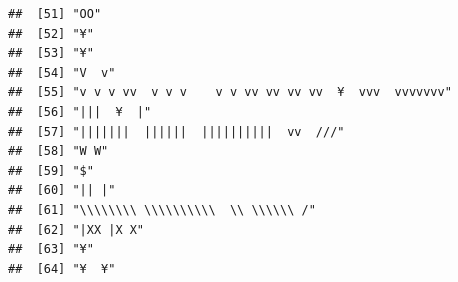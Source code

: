 \documentclass[
]{article}
\begin{document}
\begin{verbatim}
##  [51] "OO"                                                                                                                                       
##  [52] "¥"                                                                                                                                        
##  [53] "¥"                                                                                                                                        
##  [54] "V  v"                                                                                                                                     
##  [55] "v v v vv  v v v    v v vv vv vv vv  ¥  vvv  vvvvvvv"                                                                                      
##  [56] "|||  ¥  |"                                                                                                                                
##  [57] "|||||||  ||||||  ||||||||||  vv  ///"                                                                                                     
##  [58] "W W"                                                                                                                                      
##  [59] "$"                                                                                                                                        
##  [60] "|| |"                                                                                                                                     
##  [61] "\\\\\\\\ \\\\\\\\\\  \\ \\\\\\ /"                                                                                                         
##  [62] "|XX |X X"                                                                                                                                 
##  [63] "¥"                                                                                                                                        
##  [64] "¥  ¥"                                                                                                                                     

\end{verbatim}
\end{document}
